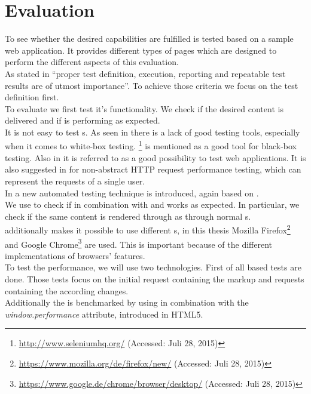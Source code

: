 \section{Evaluation\label{chap:evaluation}}
To see whether the desired capabilities are fulfilled \lare{} is tested based on a sample web application.
It provides different types of pages which are designed to perform the different aspects of this evaluation.
\\
As stated in \cite{palomaki2010web} \enquote{proper test definition, execution, reporting and repeatable test results are of utmost importance}.
To achieve those criteria we focus on the test definition first.
\\
To evaluate \lare{} we first test it's functionality.
We check if the desired content is delivered and if \lare{} is performing as expected.
\\
It is not easy to test \ajax{} \webApplication{}s.
As seen in \cite{marchetto2007testing} there is a lack of good testing tools, especially when it comes to white-box testing.
\selenium{}\footnote{\url{http://www.seleniumhq.org/} (Accessed: Juli 28, 2015)} is mentioned as a good tool for black-box testing.
Also in \cite{lundmarkautomatic} it is referred to as a good possibility to test web applications.
It is also suggested in \cite{palomaki2010web} for non-abstract HTTP request performance testing, which can represent the requests of a single user.
\\
In \cite{marchetto2008state} a new automated testing technique is introduced, again based on \selenium{}.
\\
We use \selenium{} to check if \phpLare{} in combination with \twigLare{} and \lareJS{} works as expected.
In particular, we check if the same content is rendered through \lare{} as through normal \httpRequest{}s.
\\
\selenium{} additionally makes it possible to use different \webdriver{}s, in this thesis Mozilla Firefox\footnote{\url{https://www.mozilla.org/de/firefox/new/} (Accessed: Juli 28, 2015)} and Google Chrome\footnote{\url{https://www.google.de/chrome/browser/desktop/} (Accessed: Juli 28, 2015)} are used.
This is important because of the different implementations of browsers' features.
\\
To test the performance, we will use two technologies.
First of all \curl{} based tests are done.
Those tests focus on the initial request containing the markup and \lare{} requests containing the according changes.
\\
Additionally the \webApplication{} is benchmarked by using \selenium{} in combination with the \emph{window.performance} attribute, introduced in HTML5.
